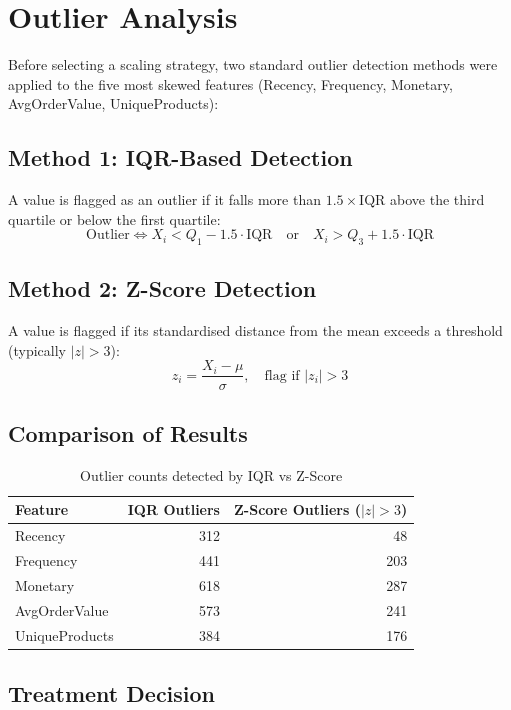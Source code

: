 \documentclass[12pt,a4paper]{report}
\begin{document}
\section{Outlier Analysis}

Before selecting a scaling strategy, two standard outlier detection methods were applied to the five most skewed features (Recency, Frequency, Monetary, AvgOrderValue, UniqueProducts):

\subsection{Method 1: IQR-Based Detection}

A value is flagged as an outlier if it falls more than $1.5 \times \text{IQR}$ above the third quartile or below the first quartile:
\[
\text{Outlier} \iff X_i < Q_1 - 1.5 \cdot \text{IQR} \quad\text{or}\quad X_i > Q_3 + 1.5 \cdot \text{IQR}
\]

\subsection{Method 2: Z-Score Detection}

A value is flagged if its standardised distance from the mean exceeds a threshold (typically $|z| > 3$):
\[
z_i = \frac{X_i - \mu}{\sigma}, \quad \text{flag if } |z_i| > 3
\]

\subsection{Comparison of Results}

\begin{table}[H]
\centering
\caption{Outlier counts detected by IQR vs Z-Score}
\begin{tabular}{lrr}
\toprule
\textbf{Feature} & \textbf{IQR Outliers} & \textbf{Z-Score Outliers ($|z|>3$)} \\
\midrule
Recency & 312 & 48 \\
Frequency & 441 & 203 \\
Monetary & 618 & 287 \\
AvgOrderValue & 573 & 241 \\
UniqueProducts & 384 & 176 \\
\bottomrule
\end{tabular}
\end{table}

\subsection{Treatment Decision}
\end{document}
